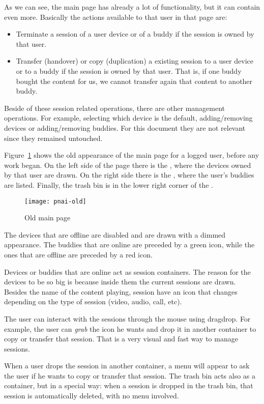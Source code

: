 As we can see, the main  page has already a lot of functionality, but it can contain even more. Basically the actions available to that user in that page are:

\begin{itemize}
  \item Terminate a session of a user device or of a buddy if the session is owned by that user.
  \item Transfer (handover) or copy (duplication) a existing session to a user device or to a buddy if the session is owned by that user. That is, if one buddy bought the content for us, we cannot transfer again that content to another buddy.
\end{itemize}

Beside of these session related operations, there are other management operations.
For example, selecting which device is the default, adding/removing devices or adding/removing buddies.
For this document they are not relevant since they remained untouched.

Figure~\ref{fig:pnai-old} shows the old appearance of the main page for a logged user, before any work began.
On the left side of the page there is the , where the devices owned by that user are drawn.
On the right side there is the , where the user's buddies are listed.
Finally, the trash bin is in the lower right corner of the . 

\begin{figure}[htbp]
  \centering
    \texttt{[image: pnai-old]}
  \caption{Old main  page}
  \label{fig:pnai-old}
\end{figure}

The devices that are offline are disabled and are drawn with a dimmed appearance.
The buddies that are online are preceded by a green icon, while the ones that are offline are preceded by a red icon.

Devices or buddies that are online act as session containers.
The reason for the devices to be so big is because inside them the current sessions are drawn.
Besides the name of the content playing, session have an icon that changes depending on the type of session (video, audio, call, etc).

The user can interact with the sessions through the mouse using drag\et{}drop.
For example, the user can \emph{grab} the icon he wants and drop it in another container to copy or transfer that session.
That is a very visual and fast way to manage sessions.

When a user drops the session in another container, a menu will appear to ask the user if he wants to copy or transfer that session.
The trash bin acts also as a container, but in a special way: when a session is dropped in the trash bin, that session is automatically deleted, with no menu involved.



